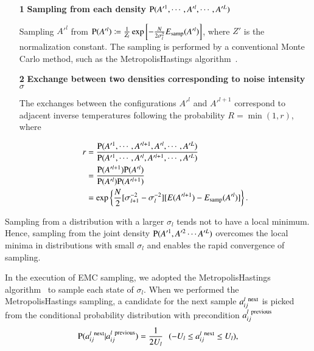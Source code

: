 \documentclass[preprint,
bibnotes,
 amsmath,amssymb,
 aps,
]{revtex4-1}
\newcounter{num}
\begin{document}
\begin{itemize}
\item[{\bf 1}]{\bf Sampling from each density ${\rm  P}(A'^1,\cdots,A'^l,\cdots, A'^L)$}\par
\parindent=3pt Sampling $A'^l$ from ${\rm P}(A'^l) \coloneqq \frac{1}{Z_l} \exp\left[-\frac{N}{2\sigma_l^2} E_{\rm samp}(A'^l)\right]$, where $Z'$ is the normalization constant.  The sampling is performed by a conventional Monte Carlo method, such as the Metropolis\textendash Hastings algorithm~\cite{hastings1970monte}. 

 \item[{\bf 2}] {\bf Exchange between two densities corresponding to noise intensity $\sigma$}\par
 \parindent=3pt The exchanges between the configurations $A'^l$ and 
 $A'^{l+1}$ correspond to adjacent inverse temperatures following the probability $R=\min(1,r)$, where\par
  
\begin{equation}
\begin{split}
\nonumber
r &= \frac{{\rm  P}(A'^1,\cdots, A'^{l+1}, A'^l,\cdots,A'^L)}{{\rm  P}(A'^1,\cdots, A'^l, A'^{l+1},\cdots,A'^L)}\\
&=\frac{{\rm  P}(A'^{l+1}){\rm  P}(A'^l)}{{\rm  P}(A'^l){\rm  P}(A'^{l+1})}\\
&=\exp\left\{\frac{N}{2}[\sigma_{l+1}^{-2} - \sigma_{l}^{-2}][E(A'^{l+1}) - E_{\rm samp}(A'^l)]\right\}.
\end{split}
\end{equation}

\end{itemize}
Sampling from a distribution with a larger $\sigma_l$ tends not to have a local minimum. 
Hence, sampling from the joint density ${\rm  P}(A'^1,A'^2\cdots A'^L)$ overcomes the local minima in distributions with small $\sigma_l$ and enables the rapid convergence of sampling.\par
In the execution of EMC sampling, we adopted the Metropolis\textendash Hastings algorithm~\cite{hastings1970monte} to sample each state of $\sigma_l$. 
When we performed the Metropolis\textendash Hastings sampling, a candidate for the next sample $a_{ij}^{l\:\:\rm next}$ is picked from the conditional probability distribution with precondition $a_{ij}^{l\:\:\rm previous}$
\begin{equation}
{\rm P}(a_{ij}^{l\:\:\rm next} | a_{ij}^{l\:\:\rm previous}) = \frac{1}{2U_l}\:\:\:(-U_l \leq a_{ij}^{l\:\:\rm next} \leq U_l),
\end{equation}
\end{document}
